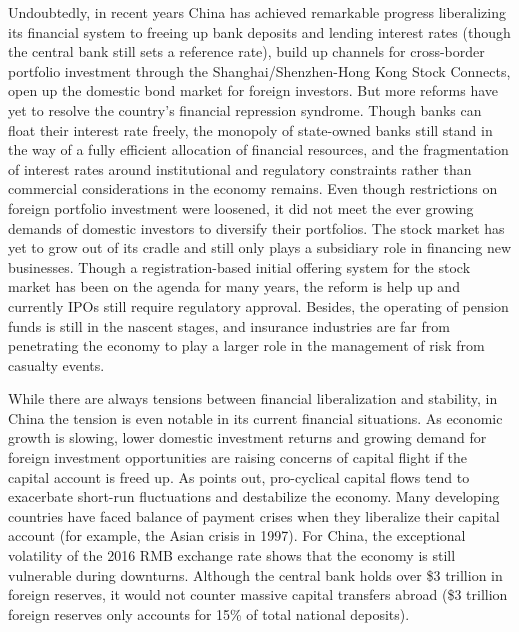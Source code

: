 \documentclass[AER]{AEA}
\begin{document}


Undoubtedly, in recent years China has achieved remarkable progress 
liberalizing its financial system to freeing up bank deposits and 
lending interest rates (though the central bank still sets a reference rate), 
build up channels for cross-border portfolio investment through 
the Shanghai/Shenzhen-Hong Kong Stock Connects, open up the domestic 
bond market for foreign investors.
But more reforms have yet to resolve the country's financial 
repression syndrome. 
Though banks can float their interest rate freely, the 
monopoly of state-owned banks still stand in the way of a fully efficient 
allocation of financial resources, and the fragmentation of interest 
rates around institutional and regulatory constraints rather than 
commercial considerations in the economy remains. Even though restrictions 
on foreign portfolio investment were loosened, it did not 
meet the ever growing demands of domestic investors to diversify 
their portfolios. The stock market has yet to grow out of its cradle and 
still only plays a subsidiary role in financing new businesses. 
Though a registration-based initial offering system for the stock 
market has been on the agenda for many years, the reform is help up  
and currently IPOs still require regulatory approval.
Besides, the operating of pension funds is still in the nascent stages, 
and insurance industries are far from penetrating the economy 
to play a larger role in the management of risk from casualty events. 

While there are always tensions between financial liberalization 
and stability, in China the tension is even notable in its  
current financial situations. 
As economic growth is slowing, lower domestic investment 
returns and growing demand for foreign investment opportunities are 
raising concerns of capital flight if the capital account is freed up. 
As \cite{stiglitz2000} points out, pro-cyclical capital flows tend to 
exacerbate short-run fluctuations and destabilize the economy. 
Many developing countries have faced balance of payment crises 
when they liberalize their capital account 
(for example, the Asian crisis in 1997). 
For China, the exceptional volatility of the 2016 RMB exchange 
rate shows that the economy is still vulnerable during downturns. 
Although the central bank holds over \$3 trillion in 
foreign reserves, it would not counter massive capital transfers abroad 
(\$3 trillion foreign reserves only accounts for 15\%  of total national 
deposits).
\end{document}
